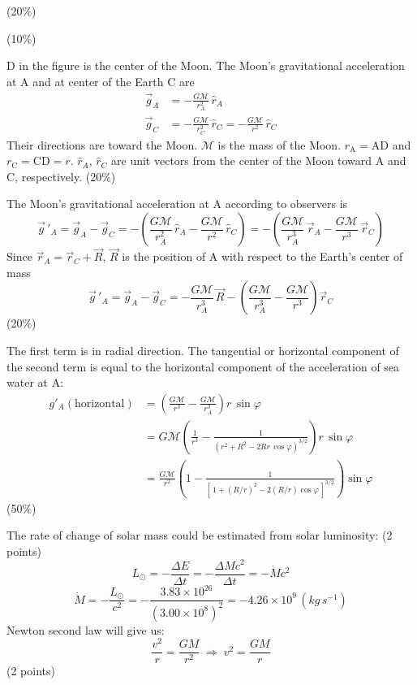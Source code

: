\hfill(20\%)

\hfill(10\%)

D in the figure is the center of the Moon. The Moon's gravitational
acceleration at A and at center of the Earth C are
\begin{align*}
  \vec{g}_A &= -\frac{G\mathcal{M}}{r_A^2}\,\hat{r}_A \\
  \vec{g}_C &= -\frac{G\mathcal{M}}{r_C^2}\,\hat{r}_C
             = -\frac{G\mathcal{M}}{r^2}\,\hat{r}_C
\end{align*}
Their directions are toward the Moon. $\mathcal{M}$ is the mass of the Moon.
$r_{\mathrm{A}} = \mathrm{AD}$ and $r_{\mathrm{C}} = \mathrm{CD} = r$.
$\hat{r}_A$, $\hat{r}_C$ are unit vectors from the center of the Moon toward
A and C, respectively. \hfill(20\%)

The Moon's gravitational acceleration at A according to observers is
\[
  \vec{g}\,'_A = \vec{g}_A - \vec{g}_C
  = -\left( \frac{G\mathcal{M}}{r_A^2}\,\hat{r}_A
          - \frac{G\mathcal{M}}{r^2}\,\hat{r}_C \right)
  = -\left( \frac{G\mathcal{M}}{r_A^3}\,\vec{r}_A
          - \frac{G\mathcal{M}}{r^3}\,\vec{r}_C \right)
\]
Since $\vec{r}_A = \vec{r}_C + \vec{R}$, $\vec{R}$ is the position of A with
respect to the Earth's center of mass
\[
  \vec{g}\,'_A = \vec{g}_A - \vec{g}_C
  = -\frac{G\mathcal{M}}{r_A^3}\,\vec{R}
    - \left( \frac{G\mathcal{M}}{r_A^3}
           - \frac{G\mathcal{M}}{r^3} \right)\vec{r}_C
\]
\hfill(20\%)

The first term is in radial direction. The tangential or horizontal component
of the second term is equal to the horizontal component of the acceleration of
sea water at A:
\begin{align*}
  g'_A(\text{horizontal})
  &= \left( \frac{G\mathcal{M}}{r^3} - \frac{G\mathcal{M}}{r_A^3} \right)
     r\,\sin\varphi \\
  &= G\mathcal{M}\left( \frac{1}{r^3}
     - \frac{1}{(r^2 + R^2 - 2Rr\,\cos\varphi)^{3/2}} \right) r\,\sin\varphi \\
  &= \frac{G\mathcal{M}}{r^2}\left( 1
     - \frac{1}{[\,1 + (R/r)^2 - 2(R/r)\cos\varphi\,]^{3/2}} \right)\sin\varphi
\end{align*}
\hfill(50\%)

The rate of change of solar mass could be estimated from solar luminosity:
\hfill(2 points)
\[
  L_\odot = -\frac{\Delta E}{\Delta t} = -\frac{\Delta M c^2}{\Delta t}
          = -\dot{M}c^2
\]
\[
  \dot{M} = -\frac{L_\odot}{c^2}
          = -\frac{3.83\times 10^{26}}{(3.00\times 10^{8})^2}
          = -4.26\times 10^{9}\,(kg\,s^{-1})
\]
Newton second law will give us:
\[
  \frac{v^2}{r} = \frac{GM}{r^2} \;\Longrightarrow\; v^2 = \frac{GM}{r}
\]
\hfill(2 points)

